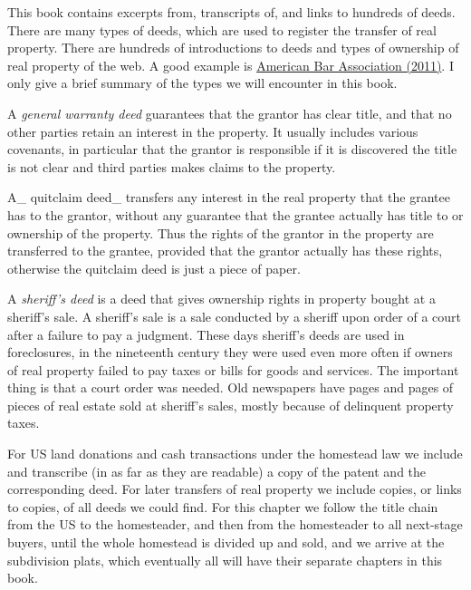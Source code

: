 \documentclass[
  12pt,
]{book}
\begin{document}
This book contains excerpts from, transcripts of, and links to hundreds of deeds. There are many types of deeds, which are used to register the transfer of real property. There are hundreds of introductions to deeds and types of ownership of real property of the web. A good example is \href{https://www.americanbar.org/newsletter/publications/law_trends_news_practice_area_e_newsletter_home/2011_summer/real_property_interests_deeds.html}{American Bar Association (2011)}. I only give a brief summary of the types we will encounter in this book.

A \emph{general warranty deed} guarantees that the grantor has clear title, and that no other parties retain an interest in the property. It usually includes various covenants, in particular that the grantor is responsible if it is discovered the title is not clear and third parties makes claims to the property.

A\_ quitclaim deed\_ transfers any interest in the real property that the grantee has to the grantor, without any guarantee that the grantee actually has title to or ownership of the property. Thus the rights of the grantor in the property are transferred to the grantee, provided that the grantor actually has these rights, otherwise the quitclaim deed is just a piece of paper.

A \emph{sheriff's deed} is a deed that gives ownership rights in property bought at a sheriff's sale. A sheriff's sale is a sale conducted by a sheriff upon order of a court after a failure to pay a judgment. These days sheriff's deeds are used in foreclosures, in the nineteenth century they were used even more often if owners of real property failed to pay taxes or bills for goods and services. The important thing is that a court order was needed. Old newspapers have pages and pages of pieces of real estate sold at sheriff's sales, mostly because of delinquent property taxes.

For US land donations and cash transactions under the homestead law we include and transcribe (in as far as they are readable) a copy of the patent and the corresponding deed. For later transfers of real property we include copies, or links to copies, of all deeds we could find. For this chapter we follow the title chain from the US to the homesteader, and then from the homesteader to all next-stage buyers, until the whole homestead is divided up and sold, and we arrive at the subdivision plats, which eventually all will have their separate chapters in this book.
\end{document}
